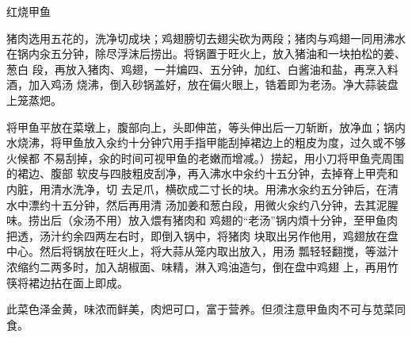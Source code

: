 \begin{recipe}{红烧甲鱼}

\ingredients


\preparation

\step 猪肉选用五花的，洗净切成块；鸡翅膀切去翅尖砍为两段；猪肉与鸡翅一同用沸水
在锅内汆五分钟，除尽浮沫后捞出。将锅置于旺火上，放入猪油和一块拍松的姜、葱白
段，再放入猪肉、鸡翅，一并煸四、五分钟，加红、白酱油和盐，再烹入料酒，加入鸡汤
烧沸，倒入砂锅盖好，放在偏火眼上，锆着即为老汤。净大蒜装盘上笼蒸𤆵。

\step 将甲鱼平放在菜墩上，腹部向上，头即伸茁，等头伸出后一刀斩断，放净血；锅内
水烧沸，将甲鱼放入汆约十分钟穴用手指甲能刮掉裙边上的粗皮为度，过久或不够火候都
不易刮掉，汆的时间可视甲鱼的老嫩而增减。）捞起，用小刀将甲鱼壳周围的裙边、腹部
软皮与四肢粗皮刮净，再入沸水中汆约十五分钟，去掉脊上甲壳和内脏，用清水洗净，切
去足爪，横砍成二寸长的块。用沸水汆约五分钟后，在清水中漂约十五分钟，然后再用清
汤加姜和葱白段，用微火汆约八分钟，去其泥腥味。捞出后（汆汤不用）放入煨有猪肉和
鸡翅的“老汤”锅内煩十分钟，至甲鱼肉把透，汤汁约余四两左右时，即倒入锅中，将猪肉
块取出另作他用，鸡翅放在盘中心。然后将锅放在旺火上，将大蒜从笼内取出放入，用汤
瓢轻轻翻搅，等滋汁浓缩约二两多时，加入胡椒面、味精，淋入鸡油造匀，倒在盘中鸡翅
上，再用竹筷将裙边拈在面上即成。

\features

此菜色泽金黄，味浓而鲜美，肉𤆵可口，富于营养。但须注意甲鱼肉不可与苋菜同食。

\end{recipe}

